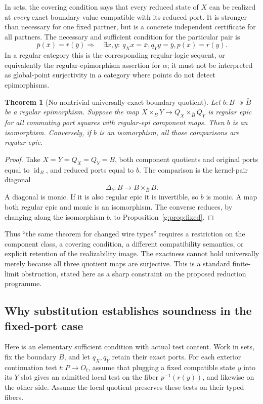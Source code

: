 \documentclass[11pt]{article}
\newtheorem{theorem}{Theorem}[section]
\theoremstyle{definition}
\theoremstyle{remark}\newtheorem{remark}[theorem]{Remark}
\newcommand{\id}{\operatorname{id}}
\begin{document}
In sets, the covering condition says that every reduced state of $X$ can
be realized at \emph{every} exact boundary value compatible with its
reduced port. It is stronger than necessary for one fixed partner, but is
a concrete independent certificate for all partners. The necessary and
sufficient condition for the particular pair is
\begin{equation}\label{g:eq:set-lift}
 \bar p(\bar x)=\bar r(\bar y) \Longrightarrow\quad
 \exists x,y:\ q_Xx=\bar x, q_Yy=\bar y, p(x)=r(y).
\end{equation}
In a regular category this is the corresponding regular-logic sequent,
or equivalently the regular-epimorphism assertion for $\alpha$; it must
not be interpreted as global-point surjectivity in a category where
points do not detect epimorphisms.

\begin{theorem}[No nontrivial universally exact boundary quotient]
\label{g:thm:boundary-no-go}
Let $b:B\twoheadrightarrow\bar B$ be a regular epimorphism. Suppose the
map $X\times_BY\to Q_X\times_{\bar B}Q_Y$ is regular epic for all
commuting port squares with regular-epi component maps. Then $b$ is an
isomorphism. Conversely, if $b$ is an isomorphism, all those comparisons
are regular epic.
\end{theorem}
\begin{proof}
Take $X=Y=Q_X=Q_Y=B$, both component quotients and original ports equal
to $\id_B$, and reduced ports equal to $b$. The comparison is the
kernel-pair diagonal
\[
 \Delta_b:B\longrightarrow B\times_{\bar B}B.
\]
A diagonal is monic. If it is also regular epic it is invertible, so $b$
is monic. A map both regular epic and monic is an isomorphism.
The converse reduces, by changing along the isomorphism $b$, to
Proposition~\ref{g:prop:fixed}.
\end{proof}

Thus ``the same theorem for changed wire types'' requires a restriction on
the component class, a covering condition, a different compatibility
semantics, or explicit retention of the realizability image. The exactness
cannot hold universally merely because all three quotient maps are
surjective. This is a standard finite-limit obstruction, stated here as a
sharp constraint on the proposed reduction programme.

\subsection{Why substitution establishes soundness in the fixed-port case}
Here is an elementary sufficient condition with actual test content.
Work in sets, fix the boundary $B$, and let $q_X,q_Y$ retain their exact
ports. For each exterior continuation test $t:P\to O_t$, assume that
plugging a fixed compatible state $y$ into its $Y$ slot gives an admitted
local test on the fiber $p^{-1}(r(y))$, and likewise on the other side.
Assume the local quotient preserves these tests on their typed fibers.
\end{document}
